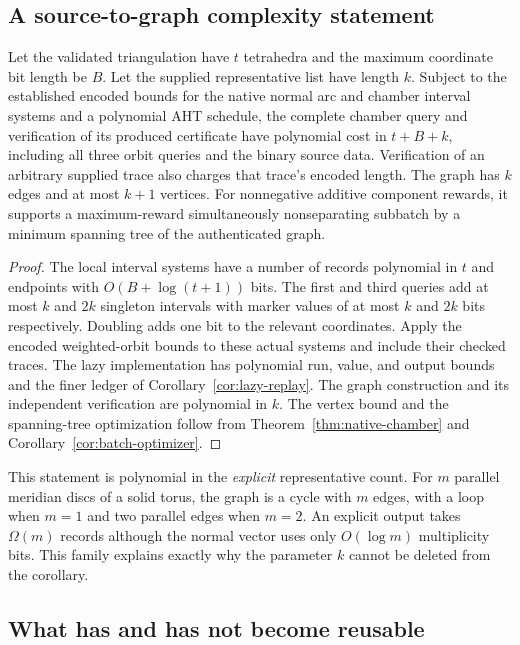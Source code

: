 \subsection{A source-to-graph complexity statement}

\begin{corollary}
\label{cor:encoded-chamber}
Let the validated triangulation have \(t\) tetrahedra and the maximum
coordinate bit length be \(B\). Let the supplied representative list have
length \(k\). Subject to the established encoded bounds for the native
normal arc and chamber interval systems and a polynomial AHT schedule,
the complete chamber query and verification of its produced certificate
have polynomial cost in \(t+B+k\), including all three orbit queries and
the binary source data. Verification of an arbitrary supplied trace also
charges that trace's encoded length. The graph has \(k\) edges and at
most \(k+1\) vertices. For nonnegative additive component rewards, it
supports a maximum-reward simultaneously nonseparating subbatch by a
minimum spanning tree of the authenticated graph.
\end{corollary}
\begin{proof}
The local interval systems have a number of records polynomial in \(t\)
and endpoints with \(O(B+\log(t+1))\) bits. The first and third queries add
at most \(k\) and \(2k\) singleton intervals with marker values of at most
\(k\) and \(2k\) bits respectively. Doubling adds one bit to the relevant
coordinates. Apply the encoded weighted-orbit bounds to these actual
systems and include their checked traces. The lazy implementation has
polynomial run, value, and output bounds and the finer ledger of
Corollary~\ref{cor:lazy-replay}. The graph construction and its independent
verification are polynomial in \(k\). The vertex bound and the spanning-tree
optimization follow from Theorem~\ref{thm:native-chamber} and
Corollary~\ref{cor:batch-optimizer}.
\end{proof}

This statement is polynomial in the \emph{explicit} representative count.
For \(m\) parallel meridian discs of a solid torus, the graph is a cycle
with \(m\) edges, with a loop when \(m=1\) and two parallel edges when
\(m=2\). An explicit output takes \(\Omega(m)\) records although the normal
vector uses only \(O(\log m)\) multiplicity bits. This family explains
exactly why the parameter \(k\) cannot be deleted from the corollary.

\subsection{What has and has not become reusable}

